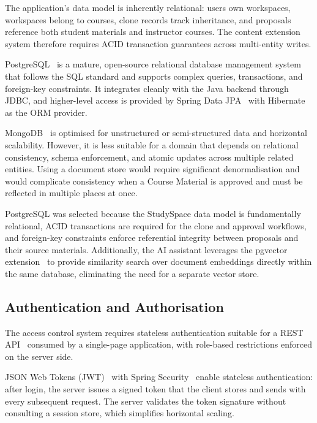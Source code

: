 The application's data model is inherently relational: users own workspaces, workspaces belong to courses, clone records track inheritance, and proposals reference both student materials and instructor courses. The content extension system therefore requires ACID transaction guarantees across multi-entity writes.

PostgreSQL~\cite{PostgreSQL} is a mature, open-source relational database management system that follows the SQL standard and supports complex queries, transactions, and foreign-key constraints. It integrates cleanly with the Java backend through JDBC, and higher-level access is provided by Spring Data JPA~\cite{SpringDataJPA} with Hibernate~\cite{Hibernate} as the ORM provider.

MongoDB~\cite{MongoDB} is optimised for unstructured or semi-structured data and horizontal scalability. However, it is less suitable for a domain that depends on relational consistency, schema enforcement, and atomic updates across multiple related entities. Using a document store would require significant denormalisation and would complicate consistency when a Course Material is approved and must be reflected in multiple places at once.

PostgreSQL was selected because the StudySpace data model is fundamentally relational, ACID transactions are required for the clone and approval workflows, and foreign-key constraints enforce referential integrity between proposals and their source materials. Additionally, the AI assistant leverages the pgvector extension~\cite{pgvector} to provide similarity search over document embeddings directly within the same database, eliminating the need for a separate vector store.

\subsection{Authentication and Authorisation}
\label{subsec:auth-tech}

The access control system requires stateless authentication suitable for a REST API~\cite{RESTapi} consumed by a single-page application, with role-based restrictions enforced on the server side.

JSON Web Tokens (JWT)~\cite{JWT_RFC7519} with Spring Security~\cite{SpringSecurity} enable stateless authentication: after login, the server issues a signed token that the client stores and sends with every subsequent request. The server validates the token signature without consulting a session store, which simplifies horizontal scaling.

